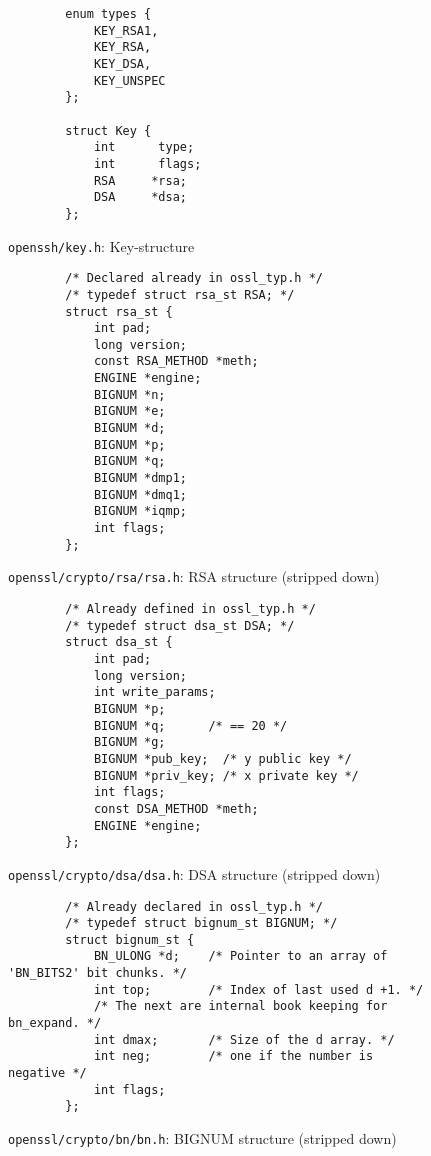 \begin{figure}[ht] \begin{center}
	\tiny
	\begin{lstlisting}
		enum types {
			KEY_RSA1,
			KEY_RSA,
			KEY_DSA,
			KEY_UNSPEC
		};

		struct Key {
			int      type;
			int      flags;
			RSA     *rsa;
			DSA     *dsa;
		};
	\end{lstlisting}
	\caption{\texttt{openssh/key.h}: Key-structure}
	\label{fig:code:key-struct}
\end{center}\end{figure}

\begin{figure}[ht] \begin{center}
	\tiny
	\begin{lstlisting}
		/* Declared already in ossl_typ.h */
		/* typedef struct rsa_st RSA; */
		struct rsa_st {
			int pad;
			long version;
			const RSA_METHOD *meth;
			ENGINE *engine;
			BIGNUM *n;
			BIGNUM *e;
			BIGNUM *d;
			BIGNUM *p;
			BIGNUM *q;
			BIGNUM *dmp1;
			BIGNUM *dmq1;
			BIGNUM *iqmp;
			int flags;
		};
	\end{lstlisting}
	\caption{\texttt{openssl/crypto/rsa/rsa.h}: RSA structure (stripped down)}
	\label{fig:code:rsa-struct}
\end{center}\end{figure}

\begin{figure}[ht] \begin{center}
	\tiny
	\begin{lstlisting}
		/* Already defined in ossl_typ.h */
		/* typedef struct dsa_st DSA; */
		struct dsa_st {
			int pad;
			long version;
			int write_params;
			BIGNUM *p;
			BIGNUM *q;      /* == 20 */
			BIGNUM *g;
			BIGNUM *pub_key;  /* y public key */
			BIGNUM *priv_key; /* x private key */
			int flags;
			const DSA_METHOD *meth;
			ENGINE *engine;
		};
	\end{lstlisting}
	\caption{\texttt{openssl/crypto/dsa/dsa.h}: DSA structure (stripped down)}
	\label{fig:code:dsa-struct}
\end{center}\end{figure}

\begin{figure}[ht] \begin{center}
	\tiny
	\begin{lstlisting}
		/* Already declared in ossl_typ.h */
		/* typedef struct bignum_st BIGNUM; */
		struct bignum_st {
			BN_ULONG *d;    /* Pointer to an array of 'BN_BITS2' bit chunks. */
			int top;        /* Index of last used d +1. */
			/* The next are internal book keeping for bn_expand. */
			int dmax;       /* Size of the d array. */
			int neg;        /* one if the number is negative */
			int flags;
		};
	\end{lstlisting}
	\caption{\texttt{openssl/crypto/bn/bn.h}: BIGNUM structure (stripped down)}
	\label{fig:code:bignum-struct}
\end{center}\end{figure}


